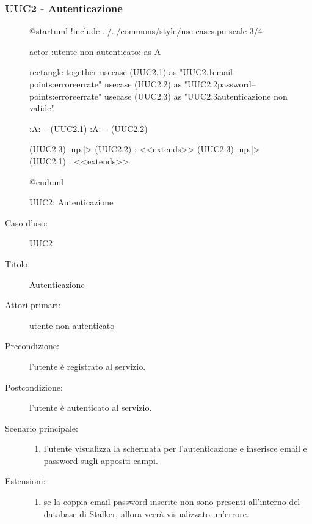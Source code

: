 \documentclass[casi-duso]{subfiles}
\begin{document}
\subsubsection{UUC2 - Autenticazione}%
\label{subsub:UUC2utente}

\begin{figure}[h!] 
  \centering 
  \begin{plantuml}
  @startuml
  !include ../../commons/style/use-cases.pu
  scale 3/4

  actor :utente non autenticato: as A
    
  rectangle {
    together {
      usecase (UUC2.1) as "UUC2.1\nInserimento email\n--\nExtension points:\nVisualizzazione errore\ncredenziali errate"
      usecase (UUC2.2) as "UUC2.2\nInserimento password\n--\nExtension points:\nVisualizzazione errore\ncredenziali errate" 
      usecase (UUC2.3) as "UUC2.3\nInformazioni autenticazione non valide"     
    }
  }
    
  :A: -- (UUC2.1)
  :A: -- (UUC2.2)
    
  (UUC2.3) .up.|> (UUC2.2) : <<extends>>
  (UUC2.3) .up.|> (UUC2.1) : <<extends>>
    
  @enduml
  \end{plantuml} 
  \caption{UUC2: Autenticazione} 
  \label{fig:uuc2} 
\end{figure}

\begin{description}
  \item[Caso d’uso:] UUC2
  \item[Titolo:] Autenticazione
  \item[Attori primari:] utente non autenticato
  \item[Precondizione:] l'utente è registrato al servizio.
  \item[Postcondizione:] l'utente è autenticato al servizio.
  \item[Scenario principale:]
        \begin{enumerate}
          \item l'utente visualizza la schermata per l'autenticazione e inserisce email e password sugli appositi campi.
        \end{enumerate}
  \item[Estensioni:]
        \begin{enumerate}
          \item se la coppia email-password inserite non sono presenti all'interno del database di Stalker, allora verrà visualizzato un'errore.
        \end{enumerate}
\end{description}
\end{document}
